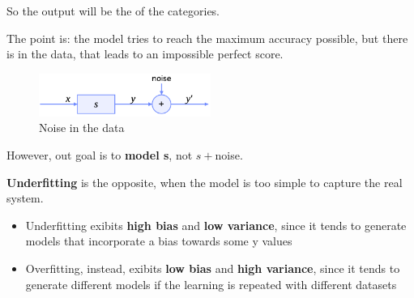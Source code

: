 So the output will be the  of the categories.


The point is: the model tries to reach the maximum accuracy possible, but there is  in the data, that leads to an impossible perfect score. 

\begin{center}
    \begin{figure}[H]
        \centering
        \includegraphics[width=0.5\textwidth]{assets/fig16.png}
        \caption{Noise in the data}
    \end{figure}
\end{center}

However, out goal is to \textbf{model s}, not $s+$noise.


\textbf{Underfitting} is the opposite, when the model is too simple to capture the real system.

\begin{itemize}
    \item Underfitting exibits \textbf{high bias} and \textbf{low variance}, since it tends to generate models that incorporate a bias towards some y values 
    \item Overfitting, instead, exibits \textbf{low bias} and \textbf{high variance}, since it tends to generate different models if the learning is repeated with different datasets 
\end{itemize}

